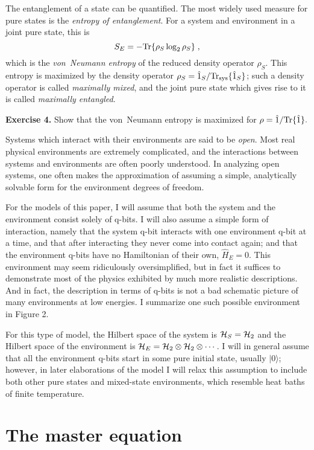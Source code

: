 \documentclass[12pt]{article}
\def\ket#1{{| #1 \rangle}}
\def\id{{\hat 1}}
\def\tr{{\rm Tr}}
\def\H{{\hat H}}
\begin{document}
The entanglement of a state can be quantified.  The most widely used
measure for pure states is the {\it entropy of entanglement}.
For a system and environment in a joint pure state, this is
\begin{equation}
S_E = - \tr\{\rho_S \log_2 \rho_S \} \;,
\end{equation}
which is the {\it von~Neumann entropy} of the reduced density operator
$\rho_S$.  This entropy is maximized by the density operator
$\rho_S = \id_S/\tr_{\rm sys}\{\id_S\}$; such a density operator
is called {\it maximally mixed},
and the joint pure state which gives rise to it is called
{\it maximally entangled}.

\medskip\noindent
{\bf Exercise 4.}  Show that the von~Neumann entropy is maximized for
$\rho = \id/\tr\{\id\}.$
\medskip

Systems which interact with their environments are said to be {\it open}.
Most real physical environments are extremely complicated, and the
interactions between systems and environments are often poorly understood.
In analyzing open systems, one often makes the approximation of assuming
a simple, analytically solvable form for the environment degrees of
freedom.

For the models of this paper, I will assume that both the system and
the environment consist solely of q-bits.  I will also assume a simple
form of interaction, namely that the system q-bit interacts with one
environment q-bit at a time, and that after interacting they never come
into contact again; and that the environment q-bits have no Hamiltonian
of their own, $\H_E=0$.  This environment may seem
ridiculously oversimplified, but in fact it suffices to demonstrate most
of the physics exhibited by much more realistic descriptions.  And in
fact, the description in terms of q-bits is not a bad schematic picture
of many environments at low energies.  I summarize one such
possible environment in Figure 2.

For this type of model, the Hilbert space of the system is
${\cal H}_S = {\cal H}_2$ and the Hilbert space of the environment
is ${\cal H}_E = {\cal H}_2 \otimes {\cal H}_2 \otimes \cdots$.
I will in general assume that all the environment q-bits start in some
pure initial state, usually $\ket0$; however, in later elaborations of
the model I will relax this assumption to include
both other pure states and mixed-state environments,
which resemble heat baths of finite temperature.


\section{The master equation}
\end{document}
